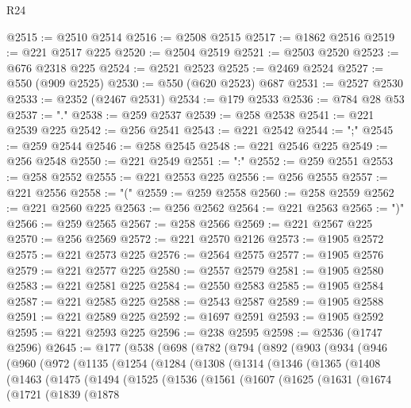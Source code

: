 \begin{lexlean}{R24}
\begin{coremodule}
@2515 := @2510 @2514
@2516 := @2508 @2515
@2517 := @1862 @2516
@2519 := @221 @2517 @225
@2520 := @2504 @2519
@2521 := @2503 @2520
@2523 := @676 @2318 @225
@2524 := @2521 @2523
@2525 := @2469 @2524
@2527 := @550 (@909 @2525)
@2530 := @550 (@620 @2523) @687
@2531 := @2527 @2530
@2533 := @2352 (@2467 @2531)
@2534 := @179 @2533
@2536 := @784 @28 @53
@2537 := "."
@2538 := @259 @2537
@2539 := @258 @2538
@2541 := @221 @2539 @225
@2542 := @256 @2541
@2543 := @221 @2542
@2544 := ";"
@2545 := @259 @2544
@2546 := @258 @2545
@2548 := @221 @2546 @225
@2549 := @256 @2548
@2550 := @221 @2549
@2551 := ":"
@2552 := @259 @2551
@2553 := @258 @2552
@2555 := @221 @2553 @225
@2556 := @256 @2555
@2557 := @221 @2556
@2558 := "("
@2559 := @259 @2558
@2560 := @258 @2559
@2562 := @221 @2560 @225
@2563 := @256 @2562
@2564 := @221 @2563
@2565 := ")"
@2566 := @259 @2565
@2567 := @258 @2566
@2569 := @221 @2567 @225
@2570 := @256 @2569
@2572 := @221 @2570 @2126
@2573 := @1905 @2572
@2575 := @221 @2573 @225
@2576 := @2564 @2575
@2577 := @1905 @2576
@2579 := @221 @2577 @225
@2580 := @2557 @2579
@2581 := @1905 @2580
@2583 := @221 @2581 @225
@2584 := @2550 @2583
@2585 := @1905 @2584
@2587 := @221 @2585 @225
@2588 := @2543 @2587
@2589 := @1905 @2588
@2591 := @221 @2589 @225
@2592 := @1697 @2591
@2593 := @1905 @2592
@2595 := @221 @2593 @225
@2596 := @238 @2595
@2598 := @2536 (@1747 @2596)
@2645 := @177
    (@538
      (@698
        (@782
          (@794
            (@892
              (@903
                (@934
                  (@946
                    (@960
                      (@972
                        (@1135
                          (@1254
                            (@1284
                              (@1308
                                (@1314
                                  (@1346
                                    (@1365
                                      (@1408
                                        (@1463
                                          (@1475
                                            (@1494
                                              (@1525
                                                (@1536
                                                  (@1561
                                                    (@1607
                                                      (@1625
                                                        (@1631
                                                          (@1674
                                                            (@1721
                                                              (@1839
                                                                (@1878

\end{coremodule}
\end{lexlean}
